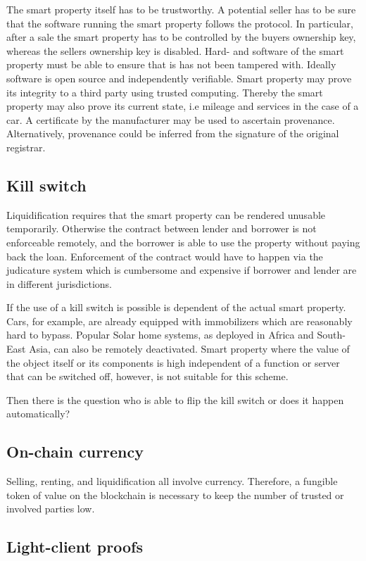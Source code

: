 The smart property itself has to be trustworthy. A potential seller has to be sure that the software running the smart property follows the protocol. In particular, after a sale the smart property has to be controlled by the buyers ownership key, whereas the sellers ownership key is disabled. Hard- and software of the smart property must be able to ensure that is has not been tampered with. Ideally software is open source and independently verifiable. Smart property may prove its integrity to a third party using trusted computing. Thereby the smart property may also prove its current state, i.e mileage and services in the case of a car. A certificate by the manufacturer may be used to ascertain provenance. Alternatively, provenance could be inferred from the signature of the original registrar.

\subsection{Kill switch}

Liquidification requires that the smart property can be rendered unusable temporarily. Otherwise the contract between lender and borrower is not enforceable remotely, and the borrower is able to use the property without paying back the loan. Enforcement of the contract would have to happen via the judicature system which is cumbersome and expensive if borrower and lender are in different jurisdictions. 

If the use of a kill switch is possible is dependent of the actual smart property. Cars, for example, are already equipped with immobilizers which are reasonably hard to bypass. Popular Solar home systems, as deployed in Africa and South-East Asia, can also be remotely deactivated. Smart property where the value of the object itself or its components is high independent of a function or server that can be switched off, however, is not suitable for this scheme. 

Then there is the question who is able to flip the kill switch or does it happen automatically?

\subsection{On-chain currency}
Selling, renting, and liquidification all involve currency. Therefore, a fungible token of value on the blockchain is necessary to keep the number of trusted or involved parties low. 

\subsection{Light-client proofs}

